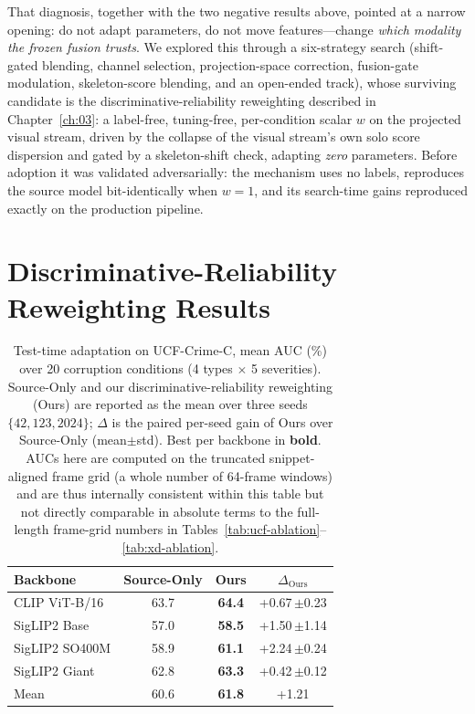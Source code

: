 That diagnosis, together with the two negative results above, pointed at a
narrow opening: do not adapt parameters, do not move features---change
\emph{which modality the frozen fusion trusts}. We explored this through a
six-strategy search (shift-gated blending, channel selection,
projection-space correction, fusion-gate modulation, skeleton-score blending,
and an open-ended track), whose surviving candidate is the
discriminative-reliability reweighting described in Chapter~\ref{ch:03}: a
label-free, tuning-free, per-condition scalar $w$ on the projected visual
stream, driven by the collapse of the visual stream's own solo score
dispersion and gated by a skeleton-shift check, adapting \emph{zero}
parameters. Before adoption it was validated adversarially: the mechanism
uses no labels, reproduces the source model bit-identically when $w=1$, and
its search-time gains reproduced exactly on the production pipeline.

\section{Discriminative-Reliability Reweighting Results}
\label{sec:disc-results}

\begin{table}[t]
\centering
\caption[Test-time adaptation on UCF-Crime-C, source-only versus reweighting]{Test-time adaptation on UCF-Crime-C, mean AUC (\%) over 20 corruption conditions (4 types $\times$ 5 severities). Source-Only and our discriminative-reliability reweighting (Ours) are reported as the mean over three seeds $\{42,123,2024\}$; $\Delta$ is the paired per-seed gain of Ours over Source-Only (mean$\pm$std). Best per backbone in \textbf{bold}. AUCs here are computed on the truncated snippet-aligned frame grid (a whole number of 64-frame windows) and are thus internally consistent within this table but not directly comparable in absolute terms to the full-length frame-grid numbers in Tables~\ref{tab:ucf-ablation}--\ref{tab:xd-ablation}.}
\label{tab:tta}
\begin{tabular}{l c c c}
\toprule
Backbone & Source-Only & Ours & $\Delta_{\text{Ours}}$ \\
\midrule
CLIP ViT-B/16 & 63.7 & \textbf{64.4} & +0.67{\footnotesize\,$\pm$0.23} \\
SigLIP2 Base & 57.0 & \textbf{58.5} & +1.50{\footnotesize\,$\pm$1.14} \\
SigLIP2 SO400M & 58.9 & \textbf{61.1} & +2.24{\footnotesize\,$\pm$0.24} \\
SigLIP2 Giant & 62.8 & \textbf{63.3} & +0.42{\footnotesize\,$\pm$0.12} \\
\midrule
Mean & 60.6 & \textbf{61.8} & +1.21 \\
\bottomrule
\end{tabular}
\end{table}

